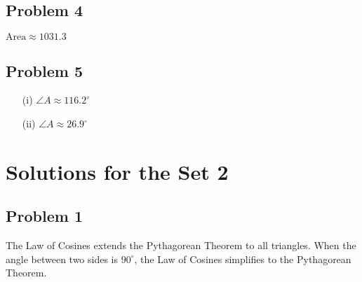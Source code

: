 \documentclass[12pt]{article}
\begin{document}
\subsection*{Problem 4}
\(\text{Area} \approx 1031.3\)

\subsection*{Problem 5}
   \begin{itemize}
        \item[(i)] \(\angle A \approx 116.2^{\circ}\)
        \item[(ii)] \(\angle A \approx 26.9^{\circ}\)
    \end{itemize}

\section*{Solutions for the Set 2}
\subsection*{Problem 1}
The Law of Cosines extends the Pythagorean Theorem to all triangles. When the angle between two sides is \(90^{\circ}\), the Law of Cosines simplifies to the Pythagorean Theorem.
\end{document}

